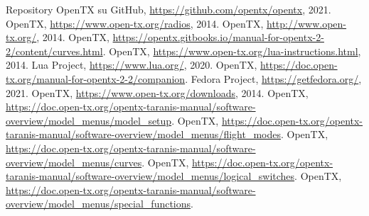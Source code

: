 \clearpage
{}
\begin{thebibliography}{9}
         Repository OpenTX su GitHub, \underline{https://github.com/opentx/opentx}, 2021.
         OpenTX, \underline{https://www.open-tx.org/radios}, 2014.
         OpenTX, \underline{http://www.open-tx.org/}, 2014.
         OpenTX, \underline{https://opentx.gitbooks.io/manual-for-opentx-2-2/content/curves.html}.
         OpenTX, \underline{https://www.open-tx.org/lua-instructions.html}, 2014.
         Lua Project, \underline{https://www.lua.org/}, 2020.
         OpenTX, \underline{https://doc.open-tx.org/manual-for-opentx-2-2/companion}.
         Fedora Project, \underline{https://getfedora.org/}, 2021.
         OpenTX, \underline{https://www.open-tx.org/downloads}, 2014.
         OpenTX, \underline{https://doc.open-tx.org/opentx-taranis-manual/software-overview/model\_menus/model\_setup}.
         OpenTX, \underline{https://doc.open-tx.org/opentx-taranis-manual/software-overview/model\_menus/flight\_modes}.
         OpenTX, \underline{https://doc.open-tx.org/opentx-taranis-manual/software-overview/model\_menus/curves}.
         OpenTX, \underline{https://doc.open-tx.org/opentx-taranis-manual/software-overview/model\_menus/logical\_switches}.
         OpenTX, \underline{https://doc.open-tx.org/opentx-taranis-manual/software-overview/model\_menus/special\_functions}.

\end{thebibliography}
